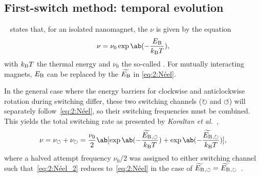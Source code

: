 \subsection{First-switch method: temporal evolution}
~\cite{neel1949theorie} states that, for an isolated nanomagnet, the  $\nu$ is given by the  equation %
\begin{equation}
	\nu = \nu_0 \exp\ab(-\frac{\EB}{\kBT}) \mathrm{,}
	\label{eq:2:Néel}
\end{equation}
with $\kBT$ the thermal energy and $\nu_0$ the so-called .
For mutually interacting magnets, $E_\mathrm{B}$ can be replaced by the  $\widetilde{E_\mathrm{B}}$ in \cref{eq:2:Néel}. \par
In the general case where the energy barriers for clockwise and anticlockwise rotation during switching differ, these two switching channels ($\circlearrowright$ and $\circlearrowleft$) will separately follow~\cref{eq:2:Néel}, so their switching frequencies must be combined.
This yields the total switching rate as presented by \textit{Koraltan et al.}~\cite{DirectionalEnergyBarrier},
\begin{equation}
	\nu = \nu_\circlearrowleft + \nu_\circlearrowright = \frac{\nu_0}{2} \ab[\exp\ab(-\frac{\EBeffLeft}{\kBT}) + \exp\ab(-\frac{\EBeffRight}{\kBT})] \mathrm{,}
	\label{eq:2:Néel_2}
\end{equation}
where a halved attempt frequency $\nu_0/2$ was assigned to either switching channel such that~\cref{eq:2:Néel_2} reduces to~\cref{eq:2:Néel} in the case of $\widetilde{E_\mathrm{B}}{}_{,\circlearrowleft}=\widetilde{E_\mathrm{B}}{}_{,\circlearrowright}$~\cite{leo2021chiral}.

